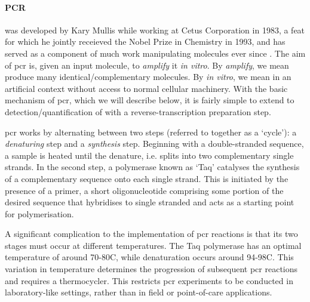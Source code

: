\documentclass[thesis.tex]{subfiles}
\begin{document}
\paragraph{PCR}
  was developed by Kary Mullis while working at Cetus Corporation in 1983, a feat for which he jointly receieved the Nobel Prize in Chemistry in 1993, and has served as a component of much work manipulating  molecules ever since \citep{saiki_enzymatic_1985, mullis_specific_1986}. The aim of \gls{pcr} is, given an input  molecule, to \emph{amplify} it \emph{in vitro}. By \emph{amplify}, we mean produce many identical/complementary  molecules. By \emph{in vitro}, we mean in an artificial context without access to normal cellular machinery. With the basic mechanism of \gls{pcr}, which we will describe below, it is fairly simple to extend to detection/quantification of  with a reverse-transcription preparation step.

\Gls{pcr} works by alternating between two steps (referred to together as a `cycle'): a \emph{denaturing} step and a \emph{synthesis} step. Beginning with a double-stranded  sequence, a sample is heated until the  denature, i.e. splits into two complementary single strands. In the second step, a polymerase known as `Taq' catalyses the synthesis of a complementary sequence onto each single strand. This is initiated by the presence of a primer, a short oligonucleotide comprising some portion of the desired sequence that hybridises to single stranded  and acts as a starting point for polymerisation. 

A significant complication to the implementation of \gls{pcr} reactions is that its two stages must occur at different temperatures. The Taq polymerase has an optimal temperature of around 70-80\nolinebreak\textdegree\nolinebreak C, while denaturation occurs around 94-98\nolinebreak\textdegree\nolinebreak C. This variation in temperature determines the progression of subsequent \gls{pcr} reactions and requires a thermocycler. This restricts \gls{pcr} experiments to be conducted in laboratory-like settings, rather than in field or point-of-care applications.
\end{document}
